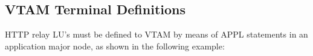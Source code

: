 \documentclass[letterpaper,10pt,english]{sphinxmanual}
\begin{document}
\subsection{VTAM Terminal Definitions}
\label{\detokenize{connectivity_guide:vtam-terminal-definitions}}\label{\detokenize{connectivity_guide:index-13}}
HTTP relay LU’s must be defined to VTAM by means of APPL statements in an application major node, as shown in the following example:

\begin{sphinxVerbatim}[commandchars=\\\{\}]
      
  
            
  

\end{sphinxVerbatim}
\end{document}
